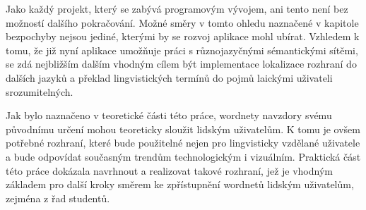 \documentclass[a4paper, 11pt, oneside]{book}
\newcommand{\itNameRef}[1]{\textit{\nameref{#1}}}
\begin{document}
			Jako každý projekt, který se zabývá programovým vývojem, ani tento není bez možností dalšího pokračování. Možné směry v tomto ohledu naznačené v kapitole \itNameRef{cha:co-se-nestihlo} bezpochyby nejsou jediné, kterými by se rozvoj aplikace mohl ubírat. Vzhledem k tomu, že již nyní aplikace umožňuje práci s různojazyčnými sémantickými sítěmi, se zdá nejbližším dalším vhodným cílem být implementace lokalizace rozhraní do dalších jazyků a překlad lingvistických termínů do pojmů laickými uživateli srozumitelných.

			Jak bylo naznačeno v teoretické části této práce, wordnety navzdory svému původnímu určení mohou teoreticky sloužit lidským uživatelům. K tomu je ovšem potřebné rozhraní, které bude použitelné nejen pro lingvisticky vzdělané uživatele a bude odpovídat současným trendům technologickým i vizuálním. Praktická část této práce dokázala navrhnout a realizovat takové rozhraní, jež je vhodným základem pro další kroky směrem ke zpřístupnění wordnetů lidským uživatelům, zejména z řad studentů.








			


 
	\printbibliography[]

\end{document}
